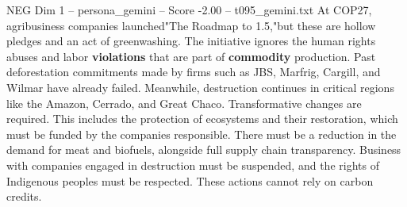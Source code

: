 \begin{textsample}{NEG Dim 1 – persona\_gemini – Score -2.00 – t095\_gemini.txt}  \label{ex:f1_neg_005}
At COP27, agribusiness companies launched"The Roadmap to 1.5,"but these are hollow pledges and an act of greenwashing.
The initiative ignores the human rights abuses and labor \textbf{violations} that are part of \textbf{commodity} production.
Past deforestation commitments made by firms such as JBS, Marfrig, Cargill, and Wilmar have already failed.
Meanwhile, destruction continues in critical regions like the Amazon, Cerrado, and Great Chaco.
Transformative changes are required.
This includes the protection of ecosystems and their restoration, which must be funded by the companies responsible.
There must be a reduction in the demand for meat and biofuels, alongside full supply chain transparency.
Business with companies engaged in destruction must be suspended, and the rights of Indigenous peoples must be respected.
These actions cannot rely on carbon credits.

\end{textsample}

